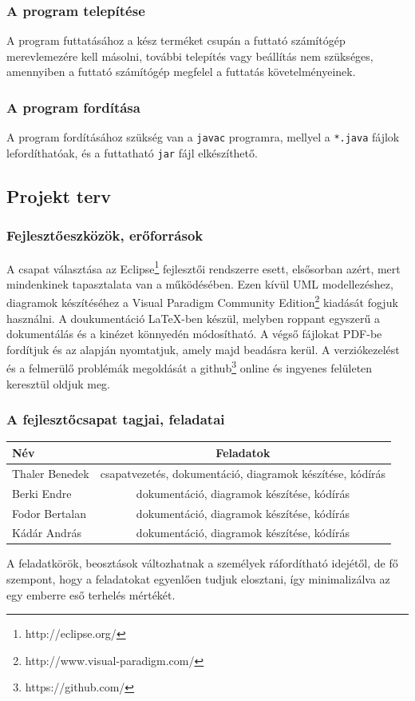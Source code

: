     \subsubsection{A program telepítése}
A program futtatásához a kész terméket csupán a futtató számítógép merevlemezére kell másolni, további telepítés vagy beállítás nem szükséges, amennyiben a futtató számítógép megfelel a futtatás követelményeinek.

    \subsubsection{A program fordítása}
A program fordításához szükség van a \texttt{javac} programra, mellyel a \texttt{*.java} fájlok lefordíthatóak, és a futtatható \texttt{jar} fájl elkészíthető.
    
\subsection{Projekt terv}

    \subsubsection{Fejlesztőeszközök, erőforrások}
	A csapat választása az Eclipse\footnote{http://eclipse.org/} fejlesztői rendszerre esett, elsősorban azért, mert mindenkinek tapasztalata van a működésében. Ezen kívül UML modellezéshez, diagramok készítéséhez a Visual Paradigm Community Edition\footnote{http://www.visual-paradigm.com/} kiadását fogjuk használni.
A doukumentáció \LaTeX -ben készül, melyben roppant egyszerű a dokumentálás és a kinézet könnyedén módosítható. A végső fájlokat PDF-be fordítjuk és az alapján nyomtatjuk, amely majd beadásra kerül. A verziókezelést és a felmerülő problémák megoldását a github\footnote{https://github.com/} online és ingyenes felületen keresztül oldjuk meg.

    \subsubsection{A fejlesztőcsapat tagjai, feladatai}
	\begin{center}
	\begin{tabular} {| l | c | }
		\hline
		Név & Feladatok\\
		\hline
		Thaler Benedek & csapatvezetés, dokumentáció, diagramok készítése, kódírás \\ 
		\hline
		Berki Endre & dokumentáció, diagramok készítése, kódírás \\
		\hline
		Fodor Bertalan & dokumentáció, diagramok készítése, kódírás \\
		\hline
		Kádár András & dokumentáció, diagramok készítése, kódírás \\
		\hline
	\end{tabular}
	\end{center}
	A feladatkörök, beosztások változhatnak a személyek ráfordítható idejétől, de fő szempont, hogy a feladatokat egyenlően tudjuk elosztani, így minimalizálva az egy emberre eső terhelés mértékét.

